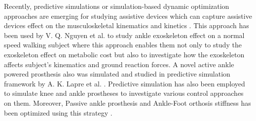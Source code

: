 \documentclass[10pt,letterpaper]{article}
\begin{document}
Recently, predictive simulations or simulation-based dynamic optimization approaches are emerging for studying assistive devices which can capture assistive devices effect on the musculoskeletal kinematics and kinetics \cite{112}. This approach has been used by V. Q. Nguyen et al. \cite{124} to study ankle exoskeleton effect on a normal speed walking subject where this approach enables them not only to study the exoskeleton effect on metabolic cost but also to investigate how the exoskeleton affects subject's kinematics and ground reaction forces. A novel active ankle powered prosthesis also was simulated and studied in predictive simulation framework by A. K. Lapre et al. \cite{125}. Predictive simulation has also been employed to simulate knee \cite{126} and ankle prostheses to investigate various control approaches on them\cite{111,127}. Moreover, Passive ankle prosthesis and Ankle-Foot orthosis stiffness has been optimized using this strategy \cite{128,129}.\\
\end{document}
